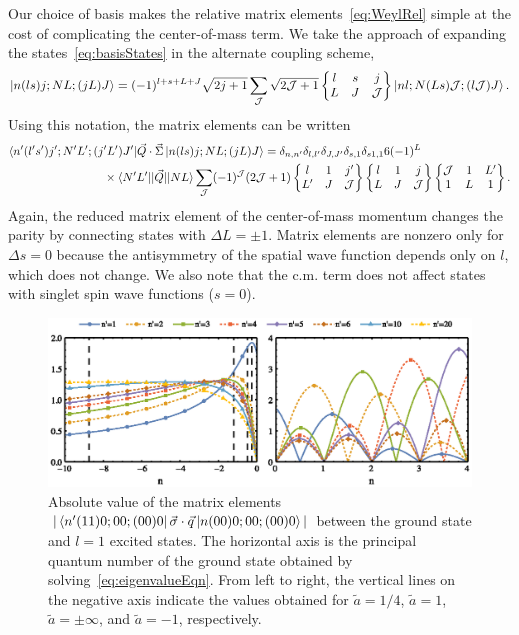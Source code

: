 Our choice of basis makes the relative matrix elements~\eqref{eq:WeylRel} simple at the cost of complicating the center-of-mass term. We take the approach of expanding the states~\eqref{eq:basisStates} in the alternate coupling scheme,
\begin{equation}\label{eq:basisStates2}
\ket{n(ls)j;NL;(jL)J}=(-1)^{l+s+L+J}\sqrt{2j+1}\sum_{\mathcal{J}}\sqrt{2\mathcal{J}+1}\begin{Bmatrix} l & s & j \\ L & J & \mathcal{J} \end{Bmatrix}\ket{nl;N(Ls)\mathcal{J};(l\mathcal{J})J}.
\end{equation}
Using this notation, the matrix elements can be written
\begin{equation}\begin{split}
\bra{n'(l's')j';N'L';(j'L')J'}&\vec{Q}\cdot\vec{\Sigma} \ket{n(ls)j;NL;(jL)J} = \delta_{n,n'}\delta_{l,l'}\delta_{J,J'}\delta_{s,1}\delta_{s1,1}   6 (-1)^{L} \\
&\hspace{-1cm}\times\braket{N'L'|| \vec{Q} || NL} \sum_{\mathcal{J}}(-1)^\mathcal{J} (2\mathcal{J}+1)\sixj{l}{1}{j'}{L'}{J}{\mathcal{J}}\sixj{l}{1}{j}{L}{J}{\mathcal{J}}\sixj{\mathcal{J}}{1}{L'}{1}{L}{1}.
\end{split}
\end{equation}
Again, the reduced matrix element of the center-of-mass momentum changes the parity by connecting states with $\Delta L=\pm1$. Matrix elements are nonzero only for $\Delta s=0$ because the antisymmetry of the spatial wave function depends only on $l$, which does not change. We also note that the c.m. term does not affect states with singlet spin wave functions ($s=0$).


\begin{figure}
\centering
\includegraphics{SOC/Figures/MatrixElts}
\caption[Coupling of ground state to $l=1$ states for the Weyl spin-orbit Hamiltonian]{\label{fig:matrixElts}Absolute value of the matrix elements $|\bra{n'(11)0;00;(00)0}\vec{\sigma}\cdot\vec{q}\ket{n(00)0;00;(00)0}|$ between the ground state and $l=1$ excited states. The horizontal axis is the principal quantum number of the ground state obtained by solving~\eqref{eq:eigenvalueEqn}. From left to right, the vertical lines on the negative axis indicate the values obtained for $\tilde{a}=1/4$, $\tilde{a}=1$, $\tilde{a}=\pm\infty$, and $\tilde{a}=-1$, respectively.} 
\end{figure}

